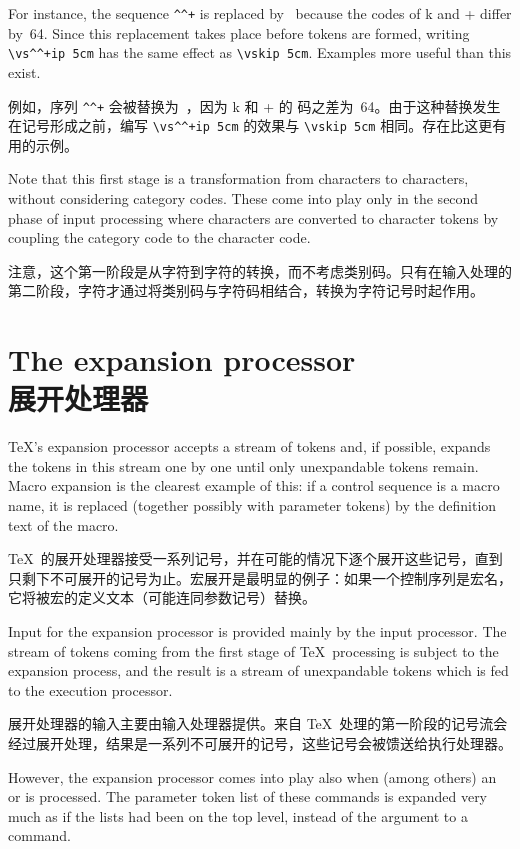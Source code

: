 For instance, the sequence \verb>^^+> is replaced by~ because
the \ascii{} codes of \n k and \n + differ by~64. 
Since this replacement takes place before tokens are formed,
writing \verb>\vs^^+ip 5cm> has the same effect as
\verb>\vskip 5cm>. Examples more useful than this exist.

例如，序列 \verb>^^+> 会被替换为~，因为 \n k 和 \n + 的 \ascii{} 码之差为~64。由于这种替换发生在记号形成之前，编写 \verb>\vs^^+ip 5cm> 的效果与 \verb>\vskip 5cm> 相同。存在比这更有用的示例。


Note that this first stage is a transformation from
characters to characters, without considering category
codes. These come into play only in the second phase
of input processing where characters are converted
to character tokens by coupling the category code
to the character code.

注意，这个第一阶段是从字符到字符的转换，而不考虑类别码。只有在输入处理的第二阶段，字符才通过将类别码与字符码相结合，转换为字符记号时起作用。


\section{The expansion processor\\展开处理器}

\TeX's  expansion processor accepts a stream of tokens
and, if possible, 
expands the tokens in this stream one by one
until only unexpandable tokens remain.
Macro expansion is the clearest example of this:
if a control sequence is a macro name, it is replaced
(together possibly with parameter tokens) by 
the definition text of the macro.

\TeX\ 的展开处理器接受一系列记号，并在可能的情况下逐个展开这些记号，直到只剩下不可展开的记号为止。宏展开是最明显的例子：如果一个控制序列是宏名，它将被宏的定义文本（可能连同参数记号）替换。

Input for the expansion processor is provided mainly
by the input processor. The stream of tokens coming
from the first stage of \TeX\ processing is subject
to the expansion process, and the result is a stream
of unexpandable tokens which is fed to the execution processor.

展开处理器的输入主要由输入处理器提供。来自 \TeX\ 处理的第一阶段的记号流会经过展开处理，结果是一系列不可展开的记号，这些记号会被馈送给执行处理器。

However, the expansion processor comes into play 
also when (among others) an  or  is processed.
The parameter token list of these commands is
expanded very much as if the lists had been
on the top level, instead of the argument to a command.

